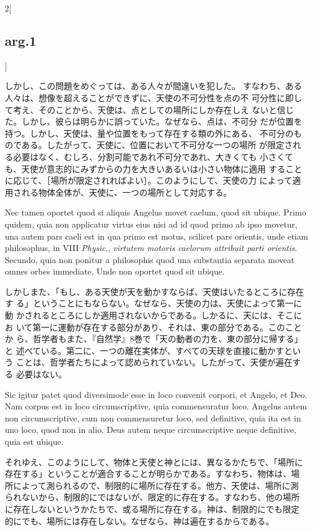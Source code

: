 \documentclass[paper=a4paper,fontsize=10pt,jafontsize=9pt,titlepage]{jlreq}
\begin{document}
\begin{paracol}{2}[\subsection{arg.1}]
\switchcolumn

しかし、この問題をめぐっては、ある人々が間違いを犯した。
すなわち、ある人々は、想像を超えることができずに、天使の不可分性を点の不
 可分性に即して考え、そのことから、天使は、点としての場所にしか存在しえ
 ないと信じた。しかし、彼らは明らかに誤っていた。なぜなら、点は、不可分
 だが位置を持つ。しかし、天使は、量や位置をもって存在する類の外にある、
 不可分のものである。したがって、天使に、位置において不可分な一つの場所
 が限定される必要はなく、むしろ、分割可能であれ不可分であれ、大きくても
 小さくても、天使が意志的にみずからの力を大きいあるいは小さい物体に適用
 することに応じて、［場所が限定されればよい］。このようにして、天使の力
 によって適用される物体全体が、天使に、一つの場所として対応する。

\switchcolumn*

Nec tamen oportet quod si aliquis Angelus movet caelum, quod sit
ubique. Primo quidem, quia non applicatur virtus eius nisi ad id quod
primo ab ipso movetur, una autem pars caeli est in qua primo est motus,
scilicet pars orientis, unde etiam philosophus, in VIII {\itshape
Physic}., {\itshape virtutem motoris caelorum attribuit parti
orientis}. Secundo, quia non ponitur a philosophis quod una substantia
separata moveat omnes orbes immediate. Unde non oportet quod sit ubique.

\switchcolumn

しかしまた、「もし、ある天使が天を動かすならば、天使はいたるところに存在す
 る」ということにもならない。なぜなら、天使の力は、天使によって第一に動
 かされるところにしか適用されないからである。しかるに、天には、そこにお
 いて第一に運動が存在する部分があり、それは、東の部分である。このことか
 ら、哲学者もまた、『自然学』8巻で「天の動者の力を、東の部分に帰する」と
 述べている。第二に、一つの離在実体が、すべての天球を直接に動かすという
 ことは、哲学者たちによって認められていない。したがって、天使が遍在する
 必要はない。

\switchcolumn*

Sic igitur patet quod
diversimode esse in loco convenit corpori, et Angelo, et Deo. Nam corpus
est in loco circumscriptive, quia commensuratur loco. Angelus autem non
circumscriptive, cum non commensuretur loco, sed definitive, quia ita
est in uno loco, quod non in alio. Deus autem neque circumscriptive
neque definitive, quia est ubique.

\switchcolumn

それゆえ、このようにして、物体と天使と神とには、異なるかたちで、「場所に
 存在する」ということが適合することが明らかである。すなわち、物体は、場
 所によって測られるので、制限的に場所に存在する。他方、天使は、場所に測
 られないから、制限的にではないが、限定的に存在する。すなわち、他の場所
 に存在しないというかたちで、或る場所に存在する。神は、制限的にでも限定
 的にでも、場所には存在しない。なぜなら、神は遍在するからである。


\end{paracol}
\end{document}
